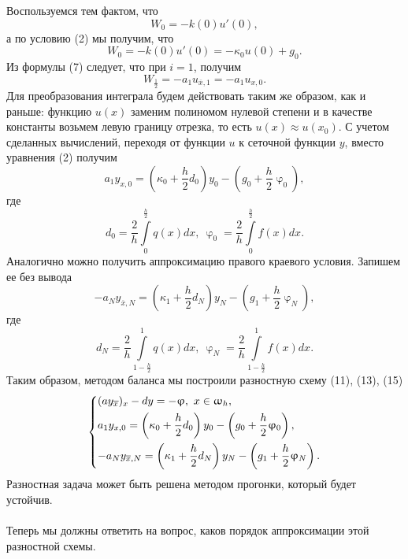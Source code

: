 \documentclass[a4paper, 12pt]{report}
\numberwithin{equation}{section}
\newcommand{\ol}{\overline}
\renewcommand{\varphi}{\upvarphi}
\renewcommand{\omega}{\upomega}
\begin{document}
		Воспользуемся тем фактом, что
		$$W_0 = -k(0)u'(0),$$
		а по условию (2) мы получим, что
		$$W_0 = -k(0)u'(0) = -\kappa_0 u(0) + g_0.$$
		Из формулы (7) следует, что при $i=1$, получим
		$$W_{\frac 12} = -a_1 u_{\ol x, 1} = -a_1 u_{x,0}.$$
		Для преобразования интеграла будем действовать таким же образом, как и раньше: функцию $u(x)$ заменим полиномом нулевой степени и в качестве константы возьмем левую границу отрезка, то есть $u(x)\approx u(x_0)$. С учетом сделанных вычислений, переходя от функции $u$ к сеточной функции $y$, вместо уравнения (2) получим
		\begin{equation}
			a_1 y_{x,0} = \left(\kappa_0 + \dfrac h2 d_0\right)y_0 - \left(g_0 + \dfrac h2 \varphi_0\right),
		\end{equation}
		где \begin{equation}
			d_0 = \dfrac2h \int\limits_0^{\frac h2}q(x)dx,\ \varphi_0 = \dfrac 2h \int\limits_0^{\frac h2}f(x)dx.
		\end{equation}
		Аналогично можно получить аппроксимацию правого краевого условия. Запишем ее без вывода
		\begin{equation}
			-a_N y_{\ol x, N} = \left(\kappa_1 + \dfrac h2 d_N\right)y_N - \left(g_1 + \dfrac h2 \varphi_N\right),
		\end{equation}
		где
		\begin{equation}
			d_N = \dfrac2h \int\limits_{1-\frac h2}^1 q(x)dx,\ \varphi_N = \dfrac 2h \int\limits_{1-\frac h2}^1f(x)dx.
		\end{equation}
		Таким образом, методом баланса мы построили разностную схему (11), (13), (15)
		$$\begin{dcases}
			(a y_{\ol x})_x - dy = -\varphi,\ x \in \omega_h, \\
			a_1 y_{x,0} = \left(\kappa_0 + \dfrac h2 d_0\right)y_0 - \left(g_0 + \dfrac h2 \varphi_0\right),\\
			-a_N y_{\ol x, N} = \left(\kappa_1 + \dfrac h2 d_N\right)y_N - \left(g_1 + \dfrac h2 \varphi_N\right).
		\end{dcases}$$
		Разностная задача может быть решена методом прогонки, который будет устойчив.\\\\
		Теперь мы должны ответить на вопрос, каков порядок аппроксимации этой разностной схемы.
\end{document}
